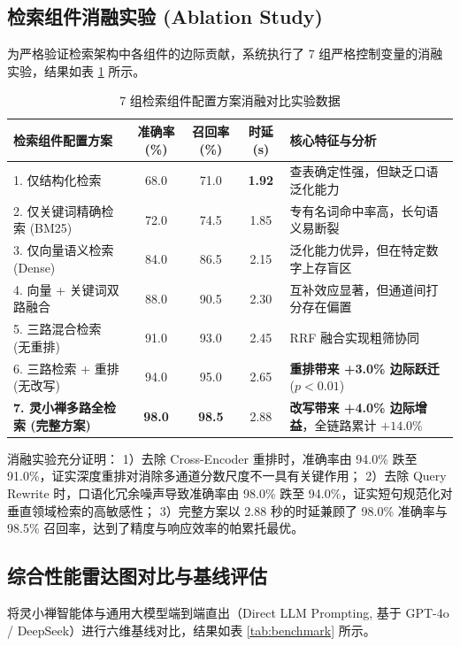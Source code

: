 \documentclass[11pt,a4paper]{ctexart}
\begin{document}
\subsection{检索组件消融实验 (Ablation Study)}
为严格验证检索架构中各组件的边际贡献，系统执行了 7 组严格控制变量的消融实验，结果如表 \ref{tab:ablation} 所示。

\begin{table}[htbp]
\centering
\small
\caption{7 组检索组件配置方案消融对比实验数据}
\label{tab:ablation}
\begin{tabularx}{\textwidth}{p{4.5cm}cccX}
\toprule
\textbf{检索组件配置方案} & \textbf{准确率(\%)} & \textbf{召回率(\%)} & \textbf{时延(s)} & \textbf{核心特征与分析} \\
\midrule
1. 仅结构化检索 & 68.0 & 71.0 & \textbf{1.92} & 查表确定性强，但缺乏口语泛化能力 \\
2. 仅关键词精确检索 (BM25) & 72.0 & 74.5 & 1.85 & 专有名词命中率高，长句语义易断裂 \\
3. 仅向量语义检索 (Dense) & 84.0 & 86.5 & 2.15 & 泛化能力优异，但在特定数字上存盲区 \\
4. 向量 + 关键词双路融合 & 88.0 & 90.5 & 2.30 & 互补效应显著，但通道间打分存在偏置 \\
5. 三路混合检索 (无重排) & 91.0 & 93.0 & 2.45 & RRF 融合实现粗筛协同 \\
6. 三路检索 + 重排 (无改写) & 94.0 & 95.0 & 2.65 & \textbf{重排带来 +3.0\% 边际跃迁} ($p < 0.01$) \\
\textbf{7. 灵小禅多路全检索 (完整方案)} & \textbf{98.0} & \textbf{98.5} & 2.88 & \textbf{改写带来 +4.0\% 边际增益}，全链路累计 $+14.0\%$ \\
\bottomrule
\end{tabularx}
\end{table}

消融实验充分证明：
1）去除 Cross-Encoder 重排时，准确率由 94.0\% 跌至 91.0\%，证实深度重排对消除多通道分数尺度不一具有关键作用；
2）去除 Query Rewrite 时，口语化冗余噪声导致准确率由 98.0\% 跌至 94.0\%，证实短句规范化对垂直领域检索的高敏感性；
3）完整方案以 2.88 秒的时延兼顾了 98.0\% 准确率与 98.5\% 召回率，达到了精度与响应效率的帕累托最优。

\subsection{综合性能雷达图对比与基线评估}
将灵小禅智能体与通用大模型端到端直出（Direct LLM Prompting, 基于 GPT-4o / DeepSeek）进行六维基线对比，结果如表 \ref{tab:benchmark} 所示。
\end{document}

